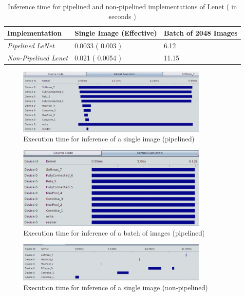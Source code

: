 \begin{table}[]
\begin{tabular}{|l|l|l|}
\hline
Implementation               & \textbf{Single Image (Effective)} & \textbf{Batch of 2048 Images} \\ \hline
\textit{Pipelined LeNet}     & 0.0033 ( 0.003 )                 & 6.12                          \\ \hline
\textit{Non-Pipelined Lenet} & 0.021 ( 0.0054 )                  & 11.15                         \\ \hline
\end{tabular}
\caption{Inference time for pipelined and non-pipelined implementations of Lenet ( in seconds ) }
\label{tab:resultinf}
\end{table}

\begin{figure}[h!]
\centering
\includegraphics[width=0.85\textwidth]{Figures/pipesingle}
\decoRule
\caption[pipesingle]{ Execution time for inference of a single image (pipelined)}
\label{fig:pipesingle}
\end{figure}

\begin{figure}[h!]
\centering
\includegraphics[width=0.85\textwidth]{Figures/pipebatch}
\decoRule
\caption[pipebatch]{ Execution time for inference of a batch of images (pipelined)}
\label{fig:pipebatch}
\end{figure}

\begin{figure}[h!]
\centering
\includegraphics[width=0.85\textwidth]{Figures/nonpipesingle}
\decoRule
\caption[nonpipesingle]{ Execution time for inference of a single image (non-pipelined)}
\label{fig:nonpipesingle}
\end{figure}

